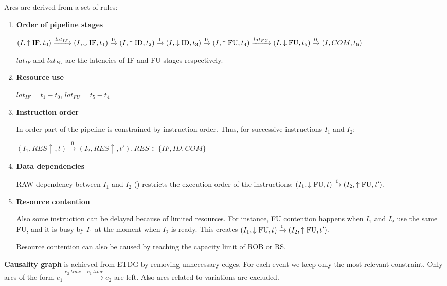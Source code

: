 Arcs are derived from a set of rules:
\begin{enumerate}
    \item \textbf{Order of pipeline stages}
    
    $(I, \uparrow\mathrm{IF}, t_0) \xrightarrow{lat_{IF}} (I, \downarrow\mathrm{IF}, t_1) \xrightarrow{0} (I, \uparrow\mathrm{ID}, t_2) \xrightarrow{1} (I, \downarrow\mathrm{ID}, t_3) \xrightarrow{0} (I, \uparrow\mathrm{FU}, t_4)  \xrightarrow{lat_{FU}} (I, \downarrow\mathrm{FU}, t_5)  \xrightarrow{0} (I, COM, t_6)$

    $lat_{IF}$ and $lat_{FU}$ are the latencies of IF and FU stages respectively.

    \item \textbf{Resource use}
    
    $lat_{IF} = t_1 - t_0$, $lat_{FU} = t_5 - t_4$

    \item \textbf{Instruction order}
    
    In-order part of the pipeline is constrained by instruction order. Thus, for successive instructions $I_1$ and $I_2$:

    $(I_1, RES\uparrow, t) \xrightarrow{0} (I_2, RES\uparrow, t'), RES \in \{IF, ID, COM\}$


    \item \textbf{Data dependencies}
    
    RAW dependency between $I_1$ and $I_2$ () restricts the execution order of the instructions:  $(I_1, \downarrow\mathrm{FU}, t) \xrightarrow{0} (I_2, \uparrow\mathrm{FU}, t')$.
    
    \item \textbf{Resource contention}
    
    Also some instruction can be delayed because of limited resources. For instance, FU contention happens when $I_1$ and $I_2$ use the same FU, and it is busy by $I_1$ at the moment when $I_2$ is ready. This creates $(I_1, \downarrow\mathrm{FU}, t) \xrightarrow{0} (I_2, \uparrow\mathrm{FU}, t')$. 

    Resource contention can also be caused by reaching the capacity limit of ROB or RS. 
\end{enumerate}

\textbf{Causality graph} is achieved from ETDG by removing unnecessary edges. For each event we keep only the most relevant constraint. Only arcs of the form $e_1 \xrightarrow{e_2.time - e_1.time} e_2$ are left. Also arcs related to variations are excluded.



